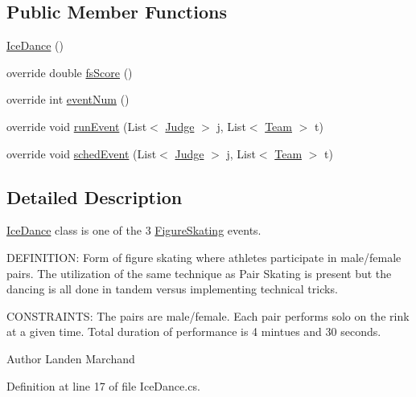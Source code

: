 \subsection*{Public Member Functions}
\begin{DoxyCompactItemize}
\item 
\hyperlink{classPCO_1_1IceDance_af8e9012b4a272fc2338c009dc25a5080}{Ice\+Dance} ()
\item 
override double \hyperlink{classPCO_1_1IceDance_a277430a17d25085022ea3567a133fa81}{fs\+Score} ()
\item 
override int \hyperlink{classPCO_1_1IceDance_a4b5fe113cbbb0d2b59f97b58c3b15e79}{event\+Num} ()
\item 
override void \hyperlink{classPCO_1_1IceDance_ace6551516fc450a992074dacaff19294}{run\+Event} (List$<$ \hyperlink{classPCO_1_1Judge}{Judge} $>$ j, List$<$ \hyperlink{classPCO_1_1Team}{Team} $>$ t)
\item 
override void \hyperlink{classPCO_1_1IceDance_a60f5dea6597535a8b06baed8d71a27e1}{sched\+Event} (List$<$ \hyperlink{classPCO_1_1Judge}{Judge} $>$ j, List$<$ \hyperlink{classPCO_1_1Team}{Team} $>$ t)
\end{DoxyCompactItemize}


\subsection{Detailed Description}
\hyperlink{classPCO_1_1IceDance}{Ice\+Dance} class is one of the 3 \hyperlink{classPCO_1_1FigureSkating}{Figure\+Skating} events. 

D\+E\+F\+I\+N\+I\+T\+I\+O\+N\+: Form of figure skating where athletes participate in male/female pairs. The utilization of the same technique as Pair Skating is present but the dancing is all done in tandem versus implementing technical tricks.

C\+O\+N\+S\+T\+R\+A\+I\+N\+T\+S\+: The pairs are male/female. Each pair performs solo on the rink at a given time. Total duration of performance is 4 mintues and 30 seconds.\begin{DoxyAuthor}{Author}
Landen Marchand 
\end{DoxyAuthor}


Definition at line 17 of file Ice\+Dance.\+cs.



